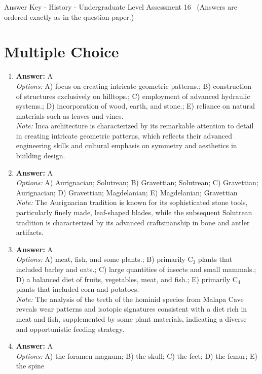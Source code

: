 \documentclass[12pt]{article}
\begin{document}
\begin{center}
Answer Key - History - Undergraduate Level Assessment 16 \
\small (Answers are ordered exactly as in the question paper.)
\end{center}

\section*{Multiple Choice}
\begin{enumerate}[label=\arabic*.]
\item \textbf{Answer:} A
\\ \textit{Options:} A) focus on creating intricate geometric patterns.; B) construction of structures exclusively on hilltops.; C) employment of advanced hydraulic systems.; D) incorporation of wood, earth, and stone.; E) reliance on natural materials such as leaves and vines.
\\ \textit{Note:} Inca architecture is characterized by its remarkable attention to detail in creating intricate geometric patterns, which reflects their advanced engineering skills and cultural emphasis on symmetry and aesthetics in building design.
\item \textbf{Answer:} A
\\ \textit{Options:} A) Aurignacian; Solutrean; B) Gravettian; Solutrean; C) Gravettian; Aurignacian; D) Gravettian; Magdelanian; E) Magdelanian; Gravettian
\\ \textit{Note:} The Aurignacian tradition is known for its sophisticated stone tools, particularly finely made, leaf-shaped blades, while the subsequent Solutrean tradition is characterized by its advanced craftsmanship in bone and antler artifacts.
\item \textbf{Answer:} A
\\ \textit{Options:} A) meat, fish, and some plants.; B) primarily C$_{3}$ plants that included barley and oats.; C) large quantities of insects and small mammals.; D) a balanced diet of fruits, vegetables, meat, and fish.; E) primarily C$_{4}$ plants that included corn and potatoes.
\\ \textit{Note:} The analysis of the teeth of the hominid species from Malapa Cave reveals wear patterns and isotopic signatures consistent with a diet rich in meat and fish, supplemented by some plant materials, indicating a diverse and opportunistic feeding strategy.
\item \textbf{Answer:} A
\\ \textit{Options:} A) the foramen magnum; B) the skull; C) the feet; D) the femur; E) the spine

\end{enumerate}
\end{document}
